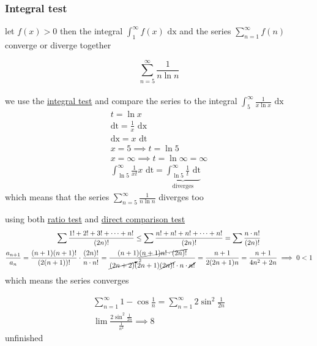 \documentclass[a4paper,12pt]{article}
\newcommand{\?}{\stackrel{?}{=}}
\begin{document}
\subsubsection{Integral test}
\label{sec:org8492316}
\begin{definition}
let \(f(x) > 0\) then the integral \(\int_1^\infty f(x) \text{ dx}\) and the series \(\sum_{n=1}^\infty f(n)\) converge or diverge together\\[0pt]

\begin{my_example}
\[
  \sum_{n=5}^\infty \frac{1}{n\ln n}
\]\\[0pt]
we use the \hyperref[sec:org8492316]{integral test} and compare the series to the integral \(\int_5^\infty \frac{1}{x\ln x} \text{ dx}\)\\[0pt]
\begin{gather*}
  t = \ln x\\
  \text{dt} = \frac1x \text{ dx}\\
  \text{dx} = x \text{ dt}\\
  x=5 \implies t = \ln5\\
  x=\infty \implies t=\ln\infty=\infty\\
  \int_{\ln5}^\infty \frac{1}{xt}x \text{ dt} = \underbrace{\int_{\ln5}^\infty \frac{1}{t} \text{ dt}}_{\text{diverges}}
\end{gather*}
which means that the series \(\sum_{n=5}^\infty \frac{1}{n\ln n}\) diverges too\\[0pt]
\end{my_example}

\begin{my_example}
using both \hyperref[sec:orgcc05a6d]{ratio test} and \hyperref[sec:orgdc02fd7]{direct comparison test}\\[0pt]
\begin{gather*}
  \sum \frac{1!+2!+3!+\cdots+n!}{(2n)!} \leq \sum \frac{n!+n!+n!+\cdots+n!}{(2n)!} = \sum \frac{n\cdot n!}{(2n)!}\\
  \frac{a_{n+1}}{a_n} = \frac{(n+1)(n+1)!}{(2(n+1))!} \cdot \frac{(2n)!}{n\cdot n!} = \frac{(n+1)\cancel{(n+1)n! \cdot (2n)!}}{\cancelto{2}{(2n+2)}(2n+1)\cancel{(2n)!} \cdot n \cdot \cancel{n!}} = \frac{n+1}{2(2n+1)n} = \frac{n+1}{4n^2+2n} \implies 0 < 1
\end{gather*}
which means the series converges\\[0pt]
\end{my_example}

\begin{my_example}
\begin{gather*}
  \sum_{n=1}^\infty 1-\cos\frac1n = \sum_{n=1}^\infty 2\sin^2\frac{1}{2n}\\
  \lim \frac{2\sin^2\frac{1}{2n}}{\frac{1}{n^2}} \implies 8
\end{gather*}
unfinished\\[0pt]
\end{my_example}


\end{definition}
\end{document}
